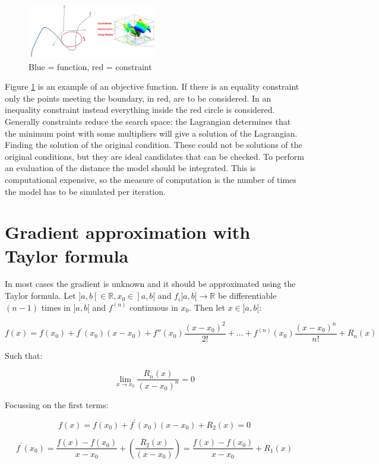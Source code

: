   \begin{figure}[H]
    \centering
    \includegraphics[width=0.5\textwidth]{example.png}
    \caption{Blue = function, red = constraint}
    \label{fig:ex}
  \end{figure}

  Figure \ref{fig:ex} is an example of an objective function.
  If there is an equality constraint only the points meeting the boundary, in red, are to be considered.
  In an inequality constraint instead everything inside the red circle is considered.
  Generally constraints reduce the search space: the Lagrangian determines that the minimum point with some multipliers will give a solution of the Lagrangian.
  Finding the solution of the original condition.
  These could not be solutions of the original conditions, but they are ideal candidates that can be checked.
  To perform an evaluation of the distance the model should be integrated.
  This is computational expensive, so the measure of computation is the number of times the model has to be simulated per iteration.

\section{Gradient approximation with Taylor formula}
In most cases the gradient is unknown and it should be approximated using the Taylor formula.
Let $]a,b[ \in \mathbb{R}, x_0 \in ]a,b[$ and $f_i]a,b[ \rightarrow \mathbb{R}$ be differentiable $(n-1)$ times in $]a,b[$ and $f^{(n)}$ continuous in $x_0$.
Then let $x \in ]a,b[$:

$$f(x)=f\left(x_0\right)+f^{\prime}\left(x_0\right)\left(x-x_0\right)+f''(x_0)\frac{(x-x_0)^2}{2!}+ ...+ f^{(n)}(x_0)\frac{(x-x_0)^n}{n!} + R_n(x)$$

Such that:

$$\lim_{x \rightarrow x_0} \frac{R_n(x)}{(x-x_0)^n} =0$$

Focussing on the first terms:

$$f(x)=f\left(x_0\right)+f^{\prime}\left(x_0\right)\left(x-x_0\right)+R_2(x)=0$$

$$f^{\prime}\left(x_0\right)= \frac{f(x)-f(x_0)}{x-x_0}+\left(\frac{R_2(x)}{(x-x_0)}\right)=\frac{f(x)-f\left(x_0\right)}{x-x_0}+R_1(x)$$

